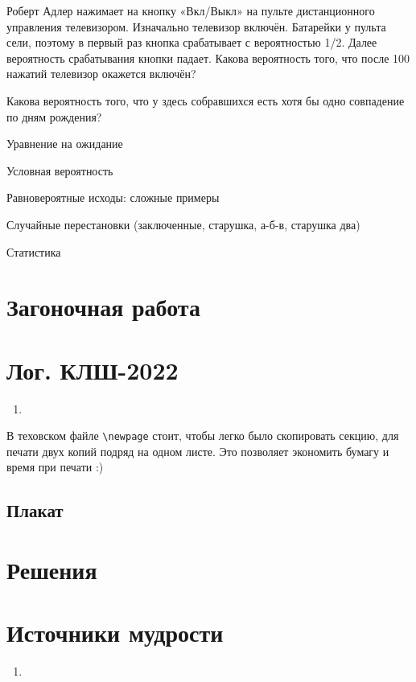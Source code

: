 \documentclass[12pt]{article}
\newcounter{problem}[section]
\theoremstyle{definition}
\begin{document}
Роберт Адлер нажимает на кнопку «Вкл/Выкл» на пульте дистанционного
управления телевизором. Изначально телевизор включён. Батарейки
у пульта сели, поэтому в первый раз кнопка срабатывает с вероятностью
1/2. Далее вероятность срабатывания кнопки падает. Какова
вероятность того, что после 100 нажатий телевизор окажется
включён?

Какова вероятность того, что у здесь собравшихся есть хотя бы одно совпадение по дням рождения?



Уравнение на ожидание

Условная вероятность

Равновероятные исходы: сложные примеры

Случайные перестановки (заключенные, старушка, а-б-в, старушка два)

Статистика




\section{Загоночная работа}





\newpage

\section{Лог. КЛШ-2022}

\begin{enumerate}
  \item 
\end{enumerate}

В теховском файле \verb|\newpage| стоит, чтобы легко было скопировать секцию, для печати двух копий подряд на одном листе.
Это позволяет экономить бумагу и время при печати :)

\subsection{Плакат}






\renewenvironment{solution}[1]{%
         \vskip .5cm plus 2cm minus 0.1cm%
         {\bfseries \hyperlink{problem:#1}{#1.}}%
}%
{%
}%



\section{Решения}



\section{Источники мудрости}


\begin{enumerate}
\item 
\end{enumerate}

\printbibliography[heading=none]
\end{document}
